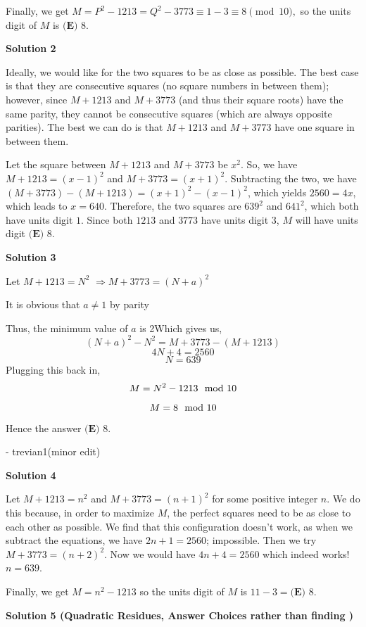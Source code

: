 \begin{enumerate}
 Finally, we get $M=P^2-1213=Q^2-3773\equiv1-3\equiv8\pmod{10},$ so the units digit of $M$ is $\boxed{\textbf{(E) }8}.$




\textbf{Solution 2}

Ideally, we would like for the two squares to be as close as possible. The best case is that they are consecutive squares (no square numbers in between them); however, since $M+1213$ and $M+3773$ (and thus their square roots) have the same parity, they cannot be consecutive squares (which are always opposite parities). The best we can do is that $M+1213$ and $M+3773$ have one square in between them. 

 Let the square between $M+1213$ and $M+3773$ be $x^2$. So, we have $M+1213 = (x-1)^2$ and $M+3773 = (x+1)^2$. Subtracting the two, we have $(M+3773)-(M+1213) = (x+1)^2 - (x-1)^2$, which yields $2560 = 4x$, which leads to $x = 640$. Therefore, the two squares are $639^2$ and $641^2$, which both have units digit $1$. Since both $1213$ and $3773$ have units digit $3$, $M$ will have units digit $\boxed{\textbf{(E) }8}$.

 



\textbf{Solution 3}

Let $M+1213=N^2$ $\Rightarrow M+3773=(N+a)^2$

 It is obvious that $a\neq1$ by parity

 Thus, the minimum value of $a$ is 2Which gives us,
 \[(N+a)^2-N^2=M+3773-(M+1213)\]
 \[4N+4=2560\]
 \[N=639\]Plugging this back in,
 \[M=N^2-1213 \space \mod \space 10\]
 \[M=8 \space \mod \space 10\]Hence the answer $\boxed{\textbf{(E) }8}$.

 - trevian1(minor edit)

 



\textbf{Solution 4}

Let $M+1213=n^2$ and $M+3773=(n+1)^2$ for some positive integer $n$. We do this because, in order to maximize $M$, the perfect squares need to be as close to each other as possible. We find that this configuration doesn't work, as when we subtract the equations, we have $2n+1=2560$; impossible. Then we try $M+3773=(n+2)^2$. Now we would have $4n+4=2560$ which indeed works! $n=639$. 

 Finally, we get $M=n^2-1213$ so the units digit of $M$ is $11-3=\boxed{\textbf{(E) }8}.$




\textbf{Solution 5 (Quadratic Residues, Answer Choices rather than finding )}


\end{enumerate}
